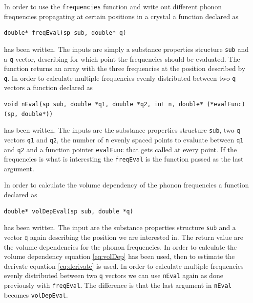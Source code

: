 \documentclass[11pt]{article}
\begin{document}
In order to use the \verb+frequencies+ function and write out different phonon frequencies propagating at certain positions in a crystal a function declared as 
\begin{lstlisting}
double* freqEval(sp sub, double* q)
\end{lstlisting} 
has been written. The inputs are simply a substance properties structure \verb+sub+ and a \verb+q+ vector, describing for which point the frequencies should be evaluated. The function returns an array with the three frequencies at the position described by \verb+q+. In order to calculate multiple frequencies evenly distributed between two \verb+q+ vectors a function declared as 
\begin{lstlisting}
void nEval(sp sub, double *q1, double *q2, int n, double* (*evalFunc)(sp, double*))
\end{lstlisting}
has been written. The inputs are the substance properties structure \verb+sub+, two \verb+q+ vectors \verb+q1+ and \verb+q2+, the number of \verb+n+ evenly spaced points to evaluate between \verb+q1+ and \verb+q2+ and a function pointer 
\verb+evalFunc+ that gets called at every point. If the frequencies is what is interesting the \verb+freqEval+ is the function passed as the last argument.


In order to calculate the volume dependency of the phonon frequencies a function declared as
\begin{lstlisting}
double* volDepEval(sp sub, double *q)
\end{lstlisting} 
has been written. The input are the substance properties structure \verb+sub+ and a vector \verb+q+ again describing the position we are interested in. The return value are the volume dependencies for the phonon frequencies. In order to calculate the volume dependency equation \ref{eq:volDep} has been used, then to estimate the derivate equation \ref{eq:derivate} is used. In order to calculate multiple frequencies evenly distributed between two \verb+q+ vectors we can use \verb+nEval+ again as done previously with \verb+freqEval+. The difference is that the last argument in \verb+nEval+ becomes \verb+volDepEval+.
\end{document}
